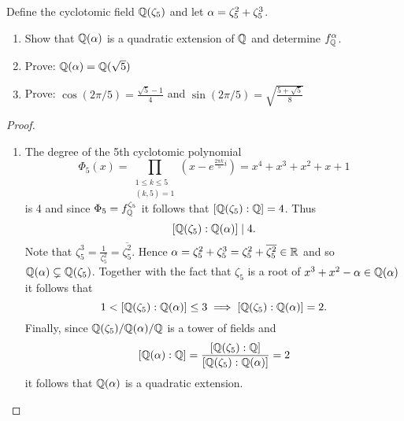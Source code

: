     \begin{ex}{21.30}
        Define the cyclotomic field $\mathbb{Q}(\zeta_5)$ and let $\alpha=\zeta_5^2+\zeta_5^3$.
        \begin{enumerate}
            \item Show that $\mathbb{Q}(\alpha)$ is a quadratic extension of $\mathbb{Q}$ and determine $f^\alpha_{\mathbb{Q}}$.
            \item Prove: $\mathbb{Q}(\alpha)=\mathbb{Q}(\sqrt{5})$
            \item Prove: $\cos(2\pi/5)=\frac{\sqrt{5}-1}{4}$ and $\sin(2\pi/5)=\sqrt{\frac{5+\sqrt{5}}{8}}$
        \end{enumerate}
    \end{ex}
    \begin{proof}
        ${}$ 
        \begin{enumerate}
            \item The degree of the 5th cyclotomic polynomial
            $$\Phi_5(x)=\prod_{\substack{1\leq k\leq 5\\(k,5)=1}}\left(x-e^{\frac{2\pi k}{5}i}\right)=x^4+x^3+x^2+x+1$$
            is 4 and since $\Phi_5=f^{\zeta_5}_{\mathbb{Q}}$ it follows that $[\mathbb{Q}(\zeta_5):\mathbb{Q}]=4$.
            Thus 
            $$[\mathbb{Q}(\zeta_5):\mathbb{Q}(\alpha)]\mid4.$$ 
            Note that $\zeta_5^3=\frac{1}{\zeta_5^2}=\overline{\zeta_5^2}$. 
            Hence $\alpha=\zeta_5^2+\zeta_5^3=\zeta_5^2+\overline{\zeta_5^2}\in\mathbb{R}$ and so $\mathbb{Q}(\alpha)\subsetneq\mathbb{Q}(\zeta_5)$.
            Together with the fact that $\zeta_5$ is a root of $x^3+x^2-\alpha\in\mathbb{Q}(\alpha)$ it follows that
            $$1<[\mathbb{Q}(\zeta_5):\mathbb{Q}(\alpha)]\leq 3\implies [\mathbb{Q}(\zeta_5):\mathbb{Q}(\alpha)]=2.$$
            Finally, since $\mathbb{Q}(\zeta_5)/\mathbb{Q}(\alpha)/\mathbb{Q}$ is a tower of fields and
            $$[\mathbb{Q}(\alpha):\mathbb{Q}]=\frac{[\mathbb{Q}(\zeta_5):\mathbb{Q}]}{[\mathbb{Q}(\zeta_5):\mathbb{Q}(\alpha)]}=2$$
            it follows that $\mathbb{Q}(\alpha)$ is a quadratic extension.


\end{enumerate}
\end{proof}
